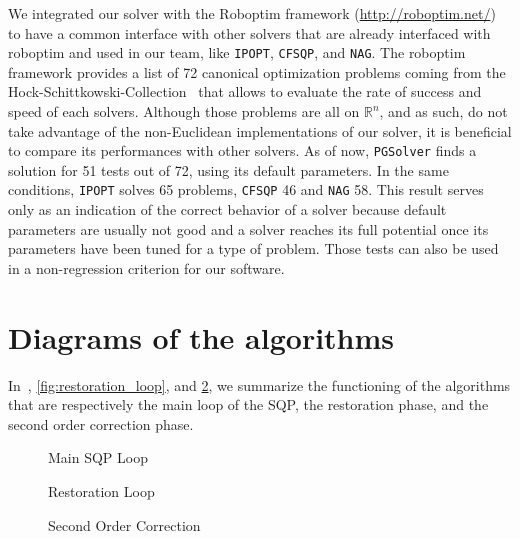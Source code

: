 We integrated our solver with the Roboptim framework (\href{http://roboptim.net/}{http://roboptim.net/}) to have a common interface with other solvers that are already interfaced with roboptim and used in our team, like {\tt IPOPT}, {\tt CFSQP}, and {\tt NAG}.
The roboptim framework provides a list of 72 canonical optimization problems coming from the Hock-Schittkowski-Collection~\cite{Hock1980} that allows to evaluate the rate of success and speed of each solvers.
Although those problems are all on $\mathbb{R}^n$, and as such, do not take advantage of the non-Euclidean implementations of our solver, it is beneficial to compare its performances with other solvers.
As of now, {\tt PGSolver} finds a solution for 51 tests out of 72, using its default parameters.
In the same conditions, {\tt IPOPT} solves 65 problems, {\tt CFSQP} 46 and {\tt NAG} 58.
This result serves only as an indication of the correct behavior of a solver because default parameters are usually not good and a solver reaches its full potential once its parameters have been tuned for a type of problem.
Those tests can also be used in a non-regression criterion for our software.


\section{Diagrams of the algorithms}
\label{sec:diagrams_of_the_algorithms}

In~, \ref{fig:restoration_loop}, and \ref{fig:second_order_correction}, we summarize the functioning of the algorithms that are respectively the main loop of the SQP, the restoration phase, and the second order correction phase.

\begin{figure}[H]
  \centering
  
  \caption{Main SQP Loop}
\label{fig:main_sqp_loop}
\end{figure}

\begin{figure}[H]
  \begin{minipage}{.5\textwidth}
    \centering
    
    \caption{Restoration Loop}
\label{fig:restoration_loop}
  \end{minipage}%
  \begin{minipage}{.5\textwidth}
    \centering
    
    \caption{Second Order Correction}
\label{fig:second_order_correction}
  \end{minipage}%
\end{figure}

